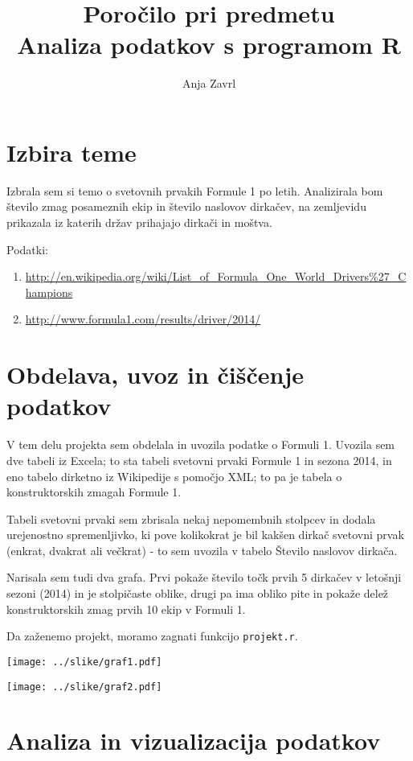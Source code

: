 \documentclass[11pt,a4paper]{article}
\begin{document}
\title{Poročilo pri predmetu \\
Analiza podatkov s programom R}
\author{Anja Zavrl}
\maketitle

\section{Izbira teme}

Izbrala sem si temo o svetovnih prvakih Formule 1 po letih. Analizirala bom število zmag posameznih ekip in število naslovov dirkačev, na zemljevidu prikazala iz katerih držav prihajajo dirkači in moštva.

Podatki: 
\begin{enumerate}
\item \url{http://en.wikipedia.org/wiki/List_of_Formula_One_World_Drivers%27_Champions}
\item \url{http://www.formula1.com/results/driver/2014/}
\end{enumerate}

\section{Obdelava, uvoz in čiščenje podatkov}

V tem delu projekta sem obdelala in uvozila podatke o Formuli 1. Uvozila sem dve tabeli iz Excela; to sta tabeli
svetovni prvaki Formule 1 in sezona 2014, in eno tabelo dirketno iz Wikipedije s pomočjo XML; to pa je tabela o konstruktorskih zmagah Formule 1. 

Tabeli svetovni prvaki sem zbrisala nekaj nepomembnih stolpcev in dodala urejenostno spremenljivko, ki pove kolikokrat je bil kakšen dirkač svetovni prvak (enkrat, dvakrat ali večkrat) - to sem uvozila v tabelo Število naslovov dirkača.

Narisala sem tudi dva grafa. Prvi pokaže število točk prvih 5 dirkačev v letošnji sezoni (2014) in je stolpičaste oblike, drugi pa ima obliko pite in pokaže delež konstruktorskih zmag prvih 10 ekip v Formuli 1.

Da zaženemo projekt, moramo zagnati funkcijo \verb|projekt.r|.

\texttt{[image: ../slike/graf1.pdf]}

\texttt{[image: ../slike/graf2.pdf]}


\section{Analiza in vizualizacija podatkov}
\end{document}
